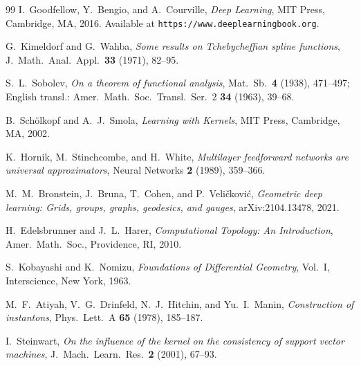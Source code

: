 \documentclass[11pt, a4paper]{article}
\theoremstyle{plain}
\theoremstyle{definition}
\begin{document}
\begin{thebibliography}{99}
I.~Goodfellow, Y.~Bengio, and A.~Courville,
\textit{Deep Learning},
MIT Press, Cambridge, MA, 2016.
Available at \texttt{https://www.deeplearningbook.org}.

G.~Kimeldorf and G.~Wahba,
\textit{Some results on Tchebycheffian spline functions},
J.\ Math.\ Anal.\ Appl.\ \textbf{33} (1971), 82--95.

S.~L.~Sobolev,
\textit{On a theorem of functional analysis},
Mat.\ Sb.\ \textbf{4} (1938), 471--497;
English transl.: Amer.\ Math.\ Soc.\ Transl.\ Ser.\ 2 \textbf{34} (1963), 39--68.

B.~Sch\"olkopf and A.~J.~Smola,
\textit{Learning with Kernels},
MIT Press, Cambridge, MA, 2002.

K.~Hornik, M.~Stinchcombe, and H.~White,
\textit{Multilayer feedforward networks are universal approximators},
Neural Networks \textbf{2} (1989), 359--366.

M.~M.~Bronstein, J.~Bruna, T.~Cohen, and P.~Veli{\v{c}}kovi{\'c},
\textit{Geometric deep learning: Grids, groups, graphs, geodesics, and gauges},
arXiv:2104.13478, 2021.

H.~Edelsbrunner and J.~L.~Harer,
\textit{Computational Topology: An Introduction},
Amer.\ Math.\ Soc., Providence, RI, 2010.

S.~Kobayashi and K.~Nomizu,
\textit{Foundations of Differential Geometry}, Vol.~I,
Interscience, New York, 1963.

M.~F.~Atiyah, V.~G.~Drinfeld, N.~J.~Hitchin, and Yu.~I.~Manin,
\textit{Construction of instantons},
Phys.\ Lett.\ A \textbf{65} (1978), 185--187.

I.~Steinwart,
\textit{On the influence of the kernel on the consistency of support vector machines},
J.\ Mach.\ Learn.\ Res.\ \textbf{2} (2001), 67--93.

\end{thebibliography}
\end{document}
